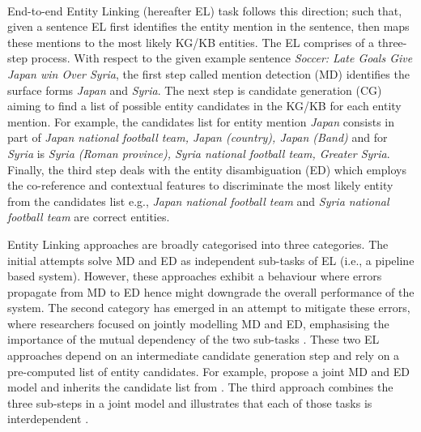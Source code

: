 \documentclass[11pt,a4paper]{article}
\begin{document}
\paragraph{}
\vspace*{4em}
\noindent End-to-end Entity Linking (hereafter EL) task follows this direction; such that, given a sentence EL first identifies the entity mention in the sentence, then maps these mentions to the most likely KG/KB entities. 
The EL comprises of a three-step process. With respect to the given example sentence \textit{Soccer: Late Goals Give Japan win Over Syria}, the first step called mention detection (MD) identifies the surface forms \textit{Japan} and \textit{Syria}. The next step is candidate generation (CG) aiming to find a list of possible entity candidates in the KG/KB for each entity mention. 
For example, the candidates list for entity mention \textit{Japan} consists in part of \textit{Japan national football team, Japan (country), Japan (Band)} and for \textit{Syria} is \textit{Syria (Roman province), Syria national football team, Greater Syria}. Finally, the third step deals with the entity disambiguation (ED) which employs the co-reference and contextual features to discriminate the most likely entity from the candidates list e.g., \textit{Japan national football team} and \textit{Syria national football team} are correct entities.

Entity Linking approaches are broadly categorised into three categories. The initial attempts  \cite{DBLP:conf/emnlp/HoffartYBFPSTTW11,piccinno2014tagme} solve MD and ED as independent sub-tasks of EL (i.e., a pipeline based system). However, these approaches exhibit a behaviour where errors propagate from MD to ED hence might downgrade the overall performance of the system. The second category has emerged in an attempt to mitigate these errors, where researchers focused on jointly modelling MD and ED, emphasising the importance of the mutual dependency of the two sub-tasks \cite{kolitsas2018end}. These two EL approaches depend on an intermediate candidate generation step and rely on a pre-computed list of entity candidates. For example, \cite{kolitsas2018end} propose a joint MD and ED model and inherits the candidate list from \cite{ganea2017deep}. The third approach combines the three sub-steps in a joint model and illustrates that each of those tasks is interdependent \cite{durrett2014joint,broscheit2019investigating}. 
\end{document}
